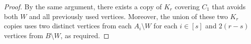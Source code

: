 \documentclass[11pt, a4paper]{article}
\newtheorem{fact}[theorem]{Fact}
\theoremstyle{definition}
\newcommand{\<}{\subseteq}
\begin{document}
\begin{proof}
By the same argument, there exists a copy of $K_r$ covering $C_1$ that avoids both $W$ and all previously used vertices. Moreover, the union of these two $K_r$ copies uses two distinct vertices from each $A_i\setminus W$ for each $i\in [s]$ and $2(r-s)$ vertices from $B\setminus W$, as required. 
\end{proof}

\end{document}
